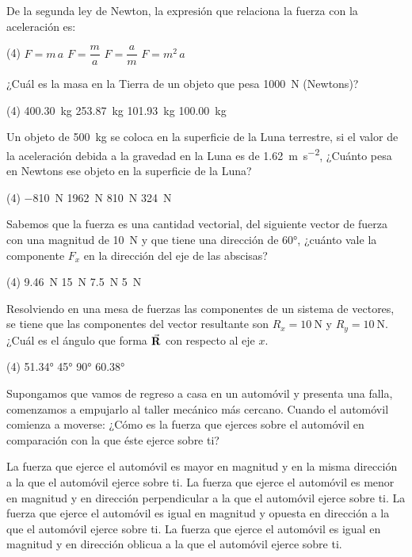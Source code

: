 \documentclass[12pt, letter]{exam}
\begin{document}
\begin{questions}
    \question De la segunda ley de Newton, la expresión que relaciona la fuerza con la aceleración es:
    \begin{tasks}(4)
        \task $F = m \, a$
        \task $F = \dfrac{m}{a}$
        \task $F = \dfrac{a}{m}$
        \task $F = m^{2} \, a$
    \end{tasks}
    \question ¿Cuál es la masa en la Tierra de un objeto que pesa \SI{1000}{\newton} (Newtons)?
    \begin{tasks}(4)
        \task \SI{400.30}{\kilo\gram}
        \task \SI{253.87}{\kilo\gram}
        \task \SI{101.93}{\kilo\gram}
        \task \SI{100.00}{\kilo\gram}
    \end{tasks}
    \question Un objeto de \SI{500}{\kilo\gram} se coloca en la superficie de la Luna terrestre, si el valor de la aceleración debida a la gravedad en la Luna es de \SI{1.62}{\meter\per\square\second}, ¿Cuánto pesa en Newtons ese objeto en la superficie de la Luna?
    \begin{tasks}(4)
        \task \SI{-810}{\newton}
        \task \SI{1962}{\newton}
        \task \SI{810}{\newton}
        \task \SI{324}{\newton}
    \end{tasks}
    \question Sabemos que la fuerza es una cantidad vectorial, del siguiente vector de fuerza con una magnitud de \SI{10}{\newton} y que tiene una dirección de \ang{60}, ¿cuánto vale la componente $F_{x}$ en la dirección del eje de las abscisas?
    \begin{tasks}(4)
        \task \SI{9.46}{\newton}
        \task \SI{15}{\newton}
        \task \SI{7.5}{\newton}
        \task \SI{5}{\newton}
    \end{tasks}
    \question Resolviendo en una mesa de fuerzas las componentes de un sistema de vectores, se tiene que las componentes del vector resultante son $R_{x} = \SI{10}{\newton}$ y $R_{y} = \SI{10}{\newton}$. ¿Cuál es el ángulo que forma $\va{R}$ con respecto al eje $x$.
    \begin{tasks}(4)
        \task \ang{51.34}
        \task \ang{45}
        \task \ang{90}
        \task \ang{60.38}
    \end{tasks}
    \question Supongamos que vamos de regreso a casa en un automóvil y presenta una falla, comenzamos a empujarlo al taller mecánico más cercano. Cuando el automóvil comienza a moverse: ¿Cómo es la fuerza que ejerces sobre el automóvil en comparación con la que éste ejerce sobre ti? 
    \begin{tasks}
        \task La fuerza que ejerce el automóvil es mayor en magnitud y en la misma dirección a la que el automóvil ejerce sobre ti.
        \task La fuerza que ejerce el automóvil es menor en magnitud y en dirección perpendicular a la que el automóvil ejerce sobre ti.
        \task La fuerza que ejerce el automóvil es igual en magnitud y opuesta en dirección a la que el automóvil ejerce sobre ti.
        \task La fuerza que ejerce el automóvil es igual en magnitud y en dirección oblicua a la que el automóvil ejerce sobre ti.
    \end{tasks}


\end{questions}
\end{document}
